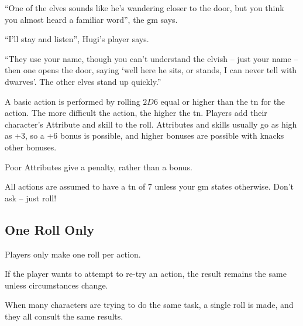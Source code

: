 \begin{multicols}{2}
\begin{exampletext}
  ``One of the elves sounds like he's wandering closer to the door, but you think you almost heard a familiar word'', the \gls{gm} says.

  ``I'll stay and listen'', Hugi's player says.

  ``They use your name, though you can't understand the elvish -- just your name -- then one opens the door, saying `well here he sits, or stands, I can never tell with dwarves'.
  The other elves stand up quickly.''

\end{exampletext}

\sidebox{
  \TNChart
}

A basic action is performed by rolling $2D6$ equal or higher than the \gls{tn} for the action.
The more difficult the action, the higher the \gls{tn}.
Players add their character's Attribute and \gls{skill} to the roll.
Attributes and \glspl{skill} usually go as high as +3, so a +6 bonus is possible, and higher bonuses are possible with knacks other bonuses.

Poor Attributes give a penalty, rather than a bonus.

All actions are assumed to have a \gls{tn} of 7 unless your \gls{gm} states otherwise.
Don't ask -- just roll!

\subsection{One Roll Only}

Players only make one roll per action.

If the player wants to attempt to re-try an action, the result remains the same unless circumstances change.

When many characters are trying to do the same task, a single roll is made, and they all consult the same results.


\end{multicols}
